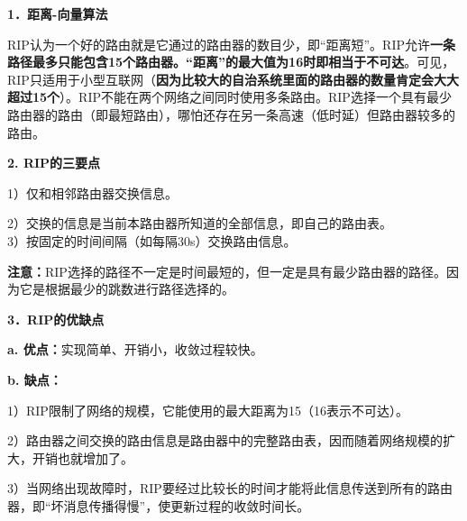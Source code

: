 \textbf{{1．距离-向量算法}}

RIP认为一个好的路由就是它通过的路由器的数目少，即``距离短''。RIP允许{\textbf{一条路径最多只能包含15个路由器。``距离''的最大值为16时即相当于不可达}}。可见，RIP只适用于小型互联网（{\textbf{因为比较大的自治系统里面的路由器的数量肯定会大大超过15个}}）。RIP不能在两个网络之间同时使用多条路由。RIP选择一个具有最少路由器的路由（即最短路由），哪怕还存在另一条高速（低时延）但路由器较多的路由。

{\textbf{2. RIP的三要点}}

1）仅和相邻路由器交换信息。

2）交换的信息是当前本路由器所知道的全部信息，即自己的路由表。\\

3）按固定的时间间隔（如每隔30s）交换路由信息。

{\textbf{注意：}{RIP选择的路径不一定是时间最短的，但一定是具有最少路由器的路径。因为它是根据最少的跳数进行路径选择的。}}

\textbf{{3．RIP的优缺点}}

\textbf{a. 优点：}实现简单、开销小，收敛过程较快。

\textbf{b. 缺点：}

1）RIP限制了网络的规模，它能使用的最大距离为15（16表示不可达）。

2）路由器之间交换的路由信息是路由器中的完整路由表，因而随着网络规模的扩大，开销也就增加了。

3）当网络出现故障时，RIP要经过比较长的时间才能将此信息传送到所有的路由器，即``坏消息传播得慢''，使更新过程的收敛时间长。

